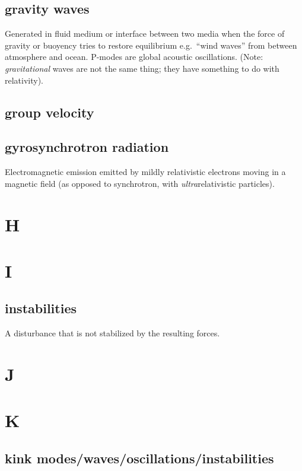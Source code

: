 \documentclass[12pt]{article}
\begin{document}
\subsection*{gravity waves}
Generated in fluid medium or interface between two media when the
force of gravity or buoyency tries to restore equilibrium
e.g.\ ``wind waves'' from between atmosphere and ocean.
P-modes are global acoustic oscillations.
(Note: \emph{gravitational} waves are not the same thing; they
have something to do with relativity).

\subsection*{group velocity}

\subsection*{gyrosynchrotron radiation}
Electromagnetic emission emitted by mildly relativistic electrons moving
in a magnetic field
(as opposed to synchrotron, with \emph{ultra}relativistic particles).

\section*{H}

\section*{I}
\subsection*{instabilities}
A disturbance that is not stabilized by the resulting forces.

\section*{J}
\section*{K}

\subsection*{kink modes/waves/oscillations/instabilities}
\end{document}
